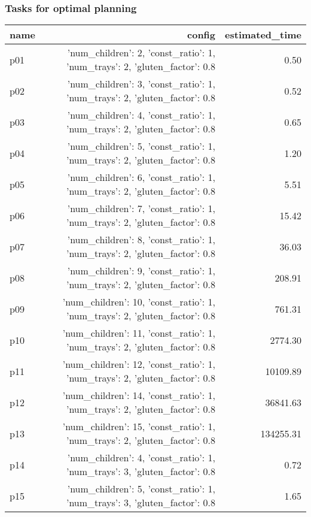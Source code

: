 \documentclass{article}
\begin{document}
                                \subsubsection*{Tasks for optimal planning}
                                
                            \begin{center}
                            \scriptsize
                            \begin{tabular}{@{}l|r|r@{}}
                            name & config & estimated\_time\\\midrule
                              p01&{'num\_children': 2, 'const\_ratio': 1, 'num\_trays': 2, 'gluten\_factor': 0.8}&0.50\\
  p02&{'num\_children': 3, 'const\_ratio': 1, 'num\_trays': 2, 'gluten\_factor': 0.8}&0.52\\
  p03&{'num\_children': 4, 'const\_ratio': 1, 'num\_trays': 2, 'gluten\_factor': 0.8}&0.65\\
  p04&{'num\_children': 5, 'const\_ratio': 1, 'num\_trays': 2, 'gluten\_factor': 0.8}&1.20\\
  p05&{'num\_children': 6, 'const\_ratio': 1, 'num\_trays': 2, 'gluten\_factor': 0.8}&5.51\\
  p06&{'num\_children': 7, 'const\_ratio': 1, 'num\_trays': 2, 'gluten\_factor': 0.8}&15.42\\
  p07&{'num\_children': 8, 'const\_ratio': 1, 'num\_trays': 2, 'gluten\_factor': 0.8}&36.03\\
  p08&{'num\_children': 9, 'const\_ratio': 1, 'num\_trays': 2, 'gluten\_factor': 0.8}&208.91\\
  p09&{'num\_children': 10, 'const\_ratio': 1, 'num\_trays': 2, 'gluten\_factor': 0.8}&761.31\\
  p10&{'num\_children': 11, 'const\_ratio': 1, 'num\_trays': 2, 'gluten\_factor': 0.8}&2774.30\\
  p11&{'num\_children': 12, 'const\_ratio': 1, 'num\_trays': 2, 'gluten\_factor': 0.8}&10109.89\\
  p12&{'num\_children': 14, 'const\_ratio': 1, 'num\_trays': 2, 'gluten\_factor': 0.8}&36841.63\\
  p13&{'num\_children': 15, 'const\_ratio': 1, 'num\_trays': 2, 'gluten\_factor': 0.8}&134255.31\\
  p14&{'num\_children': 4, 'const\_ratio': 1, 'num\_trays': 3, 'gluten\_factor': 0.8}&0.72\\
  p15&{'num\_children': 5, 'const\_ratio': 1, 'num\_trays': 3, 'gluten\_factor': 0.8}&1.65\\

\end{tabular}
\end{center}
\end{document}
